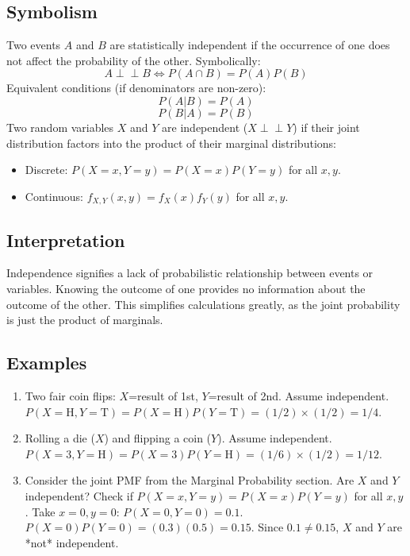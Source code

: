 \documentclass{article}
\newcommand{\Indep}{\perp \!\!\! \perp} %
\begin{document}
\subsection*{Symbolism}
Two events $A$ and $B$ are statistically independent if the occurrence of one does not affect the probability of the other. Symbolically:
\[ A \Indep B \iff P(A \cap B) = P(A) P(B) \]
Equivalent conditions (if denominators are non-zero):
\[ P(A|B) = P(A) \]
\[ P(B|A) = P(B) \]
Two random variables $X$ and $Y$ are independent ($X \Indep Y$) if their joint distribution factors into the product of their marginal distributions:
\begin{itemize}
    \item Discrete: $P(X=x, Y=y) = P(X=x) P(Y=y)$ for all $x, y$.
    \item Continuous: $f_{X,Y}(x,y) = f_X(x) f_Y(y)$ for all $x, y$.
\end{itemize}

\subsection*{Interpretation}
Independence signifies a lack of probabilistic relationship between events or variables. Knowing the outcome of one provides no information about the outcome of the other. This simplifies calculations greatly, as the joint probability is just the product of marginals.

\subsection*{Examples}
\begin{enumerate}
    \item Two fair coin flips: $X$=result of 1st, $Y$=result of 2nd. Assume independent.
    $P(X=\text{H}, Y=\text{T}) = P(X=\text{H}) P(Y=\text{T}) = (1/2) \times (1/2) = 1/4$.
    \item Rolling a die ($X$) and flipping a coin ($Y$). Assume independent.
    $P(X=3, Y=\text{H}) = P(X=3) P(Y=\text{H}) = (1/6) \times (1/2) = 1/12$.
    \item Consider the joint PMF from the Marginal Probability section. Are $X$ and $Y$ independent?
    Check if $P(X=x, Y=y) = P(X=x)P(Y=y)$ for all $x, y$.
    Take $x=0, y=0$: $P(X=0, Y=0) = 0.1$. $P(X=0)P(Y=0) = (0.3)(0.5) = 0.15$.
    Since $0.1 \neq 0.15$, $X$ and $Y$ are *not* independent.
\end{enumerate}

\end{document}
